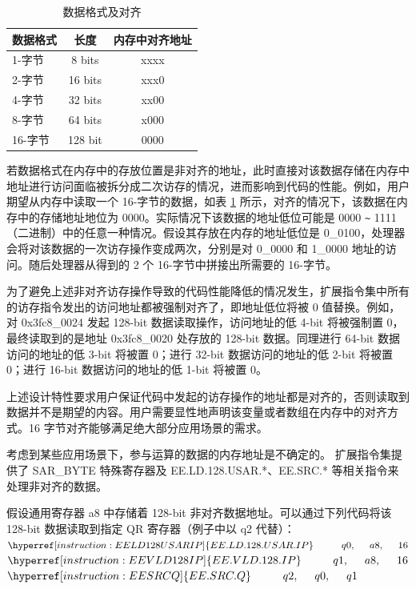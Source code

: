 \documentclass[main\_\_CN.tex]{subfiles}
\begin{document}
\begin{table}[H]
\centering
\caption{数据格式及对齐}
\label{tab:pie_data_format_align}
\begin{tabular}{|l|c|c|}
\hline
    \rowcolor{lightgray}
    \textbf{数据格式}  & \textbf{长度} & \textbf{内存中对齐地址} \\\hline

    1-字节 & 8 bits & xxxx \\\hline
    2-字节 & 16 bits & xxx0 \\\hline
    4-字节 & 32 bits & xx00 \\\hline
    8-字节 & 64 bits & x000 \\\hline
    16-字节 & 128 bit & 0000 \\\hline
    \end{tabular}
\end{table}

若数据格式在内存中的存放位置是非对齐的地址，此时直接对该数据存储在内存中地址进行访问面临被拆分成二次访存的情况，进而影响到代码的性能。例如，用户期望从内存中读取一个 16-字节的数据，如表 \ref{tab:pie_data_format_align} 所示，对齐的情况下，该数据在内存中的存储地址地位为 0000。实际情况下该数据的地址低位可能是 0000 \verb+~+ 1111（二进制）中的任意一种情况。假设其存放在内存的地址低位是 0\_0100，处理器会将对该数据的一次访存操作变成两次，分别是对 0\_0000 和 1\_0000 地址的访问。随后处理器从得到的 2 个 16-字节中拼接出所需要的 16-字节。

为了避免上述非对齐访存操作导致的代码性能降低的情况发生，扩展指令集中所有的访存指令发出的访问地址都被强制对齐了，即地址低位将被 0 值替换。例如，对 0x{}3fc8\_0024 发起 128-bit 数据读取操作，访问地址的低 4-bit 将被强制置 0，最终读取到的是地址 0x{}3fc8\_0020 处存放的 128-bit 数据。同理进行 64-bit 数据访问的地址的低 3-bit 将被置 0；进行 32-bit 数据访问的地址的低 2-bit 将被置 0；进行 16-bit 数据访问的地址的低 1-bit 将被置 0。

上述设计特性要求用户保证代码中发起的访存操作的地址都是对齐的，否则读取到数据并不是期望的内容。用户需要显性地声明该变量或者数组在内存中的对齐方式。16 字节对齐能够满足绝大部分应用场景的需求。

考虑到某些应用场景下，参与运算的数据的内存地址是不确定的。\chipname{} 扩展指令集提供了 SAR\_BYTE 特殊寄存器及 EE.LD.128.USAR.*、EE.SRC.* 等相关指令来处理非对齐的数据。

假设通用寄存器 a8 中存储着 128-bit 非对齐数据地址。可以通过下列代码将该 128-bit 数据读取到指定 QR 寄存器（例子中以 q2 代替）：\\
$ \hyperref[instruction:EELD128USARIP]{EE.LD.128.USAR.IP}\hspace{1cm}q0,\hspace{0.5cm}a8,\hspace{0.5cm}16 $ \\
$ \hyperref[instruction:EEVLD128IP]{EE.VLD.128.IP}\hspace{1cm}q1,\hspace{0.5cm}a8,\hspace{0.5cm}16 $ \\
$ \hyperref[instruction:EESRCQ]{EE.SRC.Q}\hspace{1cm}q2,\hspace{0.5cm}q0,\hspace{0.5cm}q1 $
\end{document}
